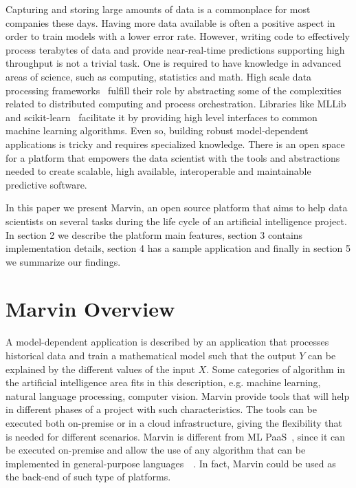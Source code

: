 \documentclass[twoside,11pt]{article}
\begin{document}
Capturing and storing large amounts of data is a commonplace for most companies these days. Having more data available is often a positive aspect in order to train models with a lower error rate. However, writing code to effectively process terabytes of data and provide near-real-time predictions supporting high throughput is not a trivial task. One is required to have knowledge in advanced areas of science, such as computing, statistics and math. High scale data processing frameworks~\citep{zaharia2010spark} fulfill their role by abstracting some of the complexities related to distributed computing and process orchestration. Libraries like MLLib~\citep{meng2015ml} and scikit-learn~\citep{pedregosa2011scikit} facilitate it by providing high level interfaces to common machine learning algorithms. Even so, building robust model-dependent applications is tricky and requires specialized knowledge. There is an open space for a platform that empowers the data scientist with the tools and abstractions needed to create scalable, high available, interoperable and maintainable predictive software.

In this paper we present Marvin, an open source platform that aims to help data scientists on several tasks during the life cycle of an artificial intelligence project. In section 2 we describe the platform main features, section 3 contains implementation details, section 4 has a sample application and finally in section 5 we summarize our findings.

\section{Marvin Overview}

A model-dependent application is described by an application that processes historical data and train a mathematical model such that the output $Y$ can be explained by the different values of the input $X$. Some categories of algorithm in the artificial intelligence area fits in this description, e.g. machine learning, natural language processing, computer vision. Marvin provide tools that will help in different phases of a project with such characteristics. The tools can be executed both on-premise or in a cloud infrastructure, giving the flexibility that is needed for different scenarios. Marvin is different from ML PaaS~\citep{pmlr-v50-azureml15}, since it can be executed on-premise and allow the use of any algorithm that can be implemented in general-purpose languages~\citep{van2003python}~\citep{odersky2004scala}. In fact, Marvin could be used as the back-end of such type of platforms.
\end{document}
